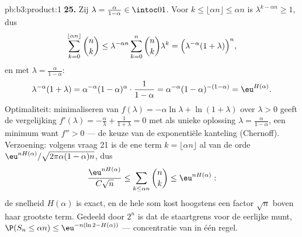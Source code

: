\begin{solution}{pb:b3:product:1}
\textbf{25.} Zij $\lambda = \frac{\alpha}{1-\alpha} \in
\intoc01$. Voor $k \leq \lfloor\alpha n\rfloor \leq \alpha n$ is
$\lambda^{k - \alpha n} \geq 1$, dus
\[
\sum_{k=0}^{\lfloor\alpha n\rfloor}\binom nk
\leq \lambda^{-\alpha n}\sum_{k=0}^{n}\binom nk\lambda^{k}
= \Bigl(\lambda^{-\alpha}(1 + \lambda)\Bigr)^{n},
\]
en met $\lambda = \frac\alpha{1-\alpha}$:
\[
\lambda^{-\alpha}(1+\lambda)
= \alpha^{-\alpha}(1-\alpha)^{\alpha}\cdot\frac1{1-\alpha}
= \alpha^{-\alpha}(1-\alpha)^{-(1-\alpha)}
= \eu^{H(\alpha)} .
\]
Optimaliteit: minimaliseren van $f(\lambda) = -\alpha\ln\lambda +
\ln(1+\lambda)$ over $\lambda > 0$ geeft de vergelijking
$f'(\lambda) = -\frac\alpha\lambda + \frac1{1+\lambda} = 0$ met
als unieke oplossing $\lambda = \frac\alpha{1-\alpha}$, een
minimum want $f'' > 0$ --- de keuze van de exponentiële kanteling
(Chernoff). Verzoening: volgens vraag 21 is de ene term $k =
\lfloor\alpha n\rfloor$ al van de orde
$\eu^{nH(\alpha)}/\sqrt{2\pi\alpha(1-\alpha)n}$, dus
\[
\frac{\eu^{nH(\alpha)}}{C\sqrt n} \leq
\sum_{k\leq\alpha n}\binom nk \leq \eu^{nH(\alpha)} :
\]
de snelheid $H(\alpha)$ is exact, en de hele som kost hoogstens
een factor $\sqrt n$ boven haar grootste term. Gedeeld door $2^n$
is dat de staartgrens voor de eerlijke munt, $\P(S_n \leq \alpha
n) \leq \eu^{-n(\ln2 - H(\alpha))}$ --- concentratie van  in
één regel.
\end{solution}
